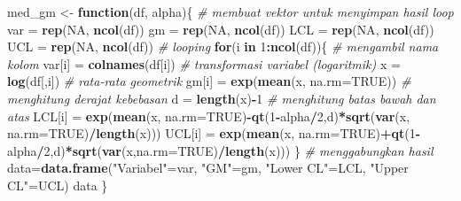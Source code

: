 \documentclass[]{book}
\newenvironment{Shaded}{\begin{snugshade}}{\end{snugshade}}
\newcommand{\KeywordTok}[1]{\textcolor[rgb]{0.13,0.29,0.53}{\textbf{#1}}}
\newcommand{\DataTypeTok}[1]{\textcolor[rgb]{0.13,0.29,0.53}{#1}}
\newcommand{\DecValTok}[1]{\textcolor[rgb]{0.00,0.00,0.81}{#1}}
\newcommand{\StringTok}[1]{\textcolor[rgb]{0.31,0.60,0.02}{#1}}
\newcommand{\CommentTok}[1]{\textcolor[rgb]{0.56,0.35,0.01}{\textit{#1}}}
\newcommand{\OtherTok}[1]{\textcolor[rgb]{0.56,0.35,0.01}{#1}}
\newcommand{\ControlFlowTok}[1]{\textcolor[rgb]{0.13,0.29,0.53}{\textbf{#1}}}
\newcommand{\OperatorTok}[1]{\textcolor[rgb]{0.81,0.36,0.00}{\textbf{#1}}}
\newcommand{\NormalTok}[1]{#1}
\begin{document}
\begin{Shaded}
\begin{Highlighting}[]
\NormalTok{med_gm <-}\StringTok{ }\ControlFlowTok{function}\NormalTok{(df, alpha)\{}
  \CommentTok{# membuat vektor untuk menyimpan hasil loop}
\NormalTok{  var =}\StringTok{ }\KeywordTok{rep}\NormalTok{(}\OtherTok{NA}\NormalTok{, }\KeywordTok{ncol}\NormalTok{(df))}
\NormalTok{  gm =}\StringTok{ }\KeywordTok{rep}\NormalTok{(}\OtherTok{NA}\NormalTok{, }\KeywordTok{ncol}\NormalTok{(df))}
\NormalTok{  LCL =}\StringTok{ }\KeywordTok{rep}\NormalTok{(}\OtherTok{NA}\NormalTok{, }\KeywordTok{ncol}\NormalTok{(df))}
\NormalTok{  UCL =}\StringTok{ }\KeywordTok{rep}\NormalTok{(}\OtherTok{NA}\NormalTok{, }\KeywordTok{ncol}\NormalTok{(df))}
  \CommentTok{# looping}
  \ControlFlowTok{for}\NormalTok{(i }\ControlFlowTok{in} \DecValTok{1}\OperatorTok{:}\KeywordTok{ncol}\NormalTok{(df))\{}
    \CommentTok{# mengambil nama kolom}
\NormalTok{    var[i] =}\StringTok{ }\KeywordTok{colnames}\NormalTok{(df[i])}
    \CommentTok{# transformasi variabel (logaritmik)}
\NormalTok{    x =}\StringTok{ }\KeywordTok{log}\NormalTok{(df[,i])}
    \CommentTok{# rata-rata geometrik}
\NormalTok{    gm[i] =}\StringTok{ }\KeywordTok{exp}\NormalTok{(}\KeywordTok{mean}\NormalTok{(x, }\DataTypeTok{na.rm=}\OtherTok{TRUE}\NormalTok{))}
    \CommentTok{# menghitung derajat kebebasan}
\NormalTok{    d =}\StringTok{ }\KeywordTok{length}\NormalTok{(x)}\OperatorTok{-}\DecValTok{1}
    \CommentTok{# menghitung batas bawah dan atas}
\NormalTok{    LCL[i] =}\StringTok{ }\KeywordTok{exp}\NormalTok{(}\KeywordTok{mean}\NormalTok{(x, }\DataTypeTok{na.rm=}\OtherTok{TRUE}\NormalTok{)}\OperatorTok{-}\KeywordTok{qt}\NormalTok{(}\DecValTok{1}\OperatorTok{-}\NormalTok{alpha}\OperatorTok{/}\DecValTok{2}\NormalTok{,d)}\OperatorTok{*}\KeywordTok{sqrt}\NormalTok{(}\KeywordTok{var}\NormalTok{(x, }\DataTypeTok{na.rm=}\OtherTok{TRUE}\NormalTok{)}\OperatorTok{/}\KeywordTok{length}\NormalTok{(x)))}
\NormalTok{    UCL[i] =}\StringTok{ }\KeywordTok{exp}\NormalTok{(}\KeywordTok{mean}\NormalTok{(x, }\DataTypeTok{na.rm=}\OtherTok{TRUE}\NormalTok{)}\OperatorTok{+}\KeywordTok{qt}\NormalTok{(}\DecValTok{1}\OperatorTok{-}\NormalTok{alpha}\OperatorTok{/}\DecValTok{2}\NormalTok{,d)}\OperatorTok{*}\KeywordTok{sqrt}\NormalTok{(}\KeywordTok{var}\NormalTok{(x,}\DataTypeTok{na.rm=}\OtherTok{TRUE}\NormalTok{)}\OperatorTok{/}\KeywordTok{length}\NormalTok{(x)))}
\NormalTok{  \}}
  \CommentTok{# menggabungkan hasil}
\NormalTok{  data=}\KeywordTok{data.frame}\NormalTok{(}\StringTok{"Variabel"}\NormalTok{=var,}
                  \StringTok{"GM"}\NormalTok{=gm,}
                  \StringTok{"Lower CL"}\NormalTok{=LCL,}
                  \StringTok{"Upper CL"}\NormalTok{=UCL)}
\NormalTok{  data}
\NormalTok{\}}
\end{Highlighting}
\end{Shaded}
\end{document}
